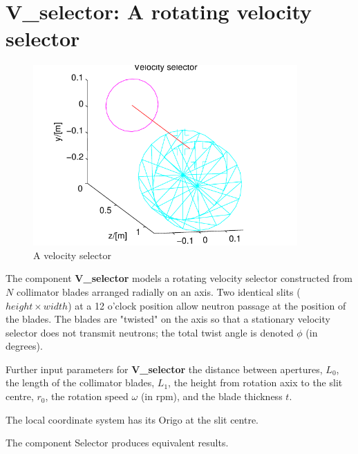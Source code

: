 \section{V\_selector: A rotating velocity selector}
\label{vselector}


\begin{figure}
  \begin{center}
    \includegraphics[width=0.9\textwidth]{figures/vselector}
  \end{center}
\caption{A velocity selector}
\label{f:vselector}
\end{figure}

The component \textbf{V\_selector} models a rotating velocity
selector constructed from $N$ collimator blades
arranged radially on an axis. Two identical slits ($height \times width$)
at a 12 o'clock position allow
neutron passage at the position of the blades.
The blades are "twisted" on the axis so that a stationary
velocity selector does not transmit neutrons; the total
twist angle is denoted $\phi$ (in degrees).

Further input parameters for \textbf{V\_selector} 
the distance between apertures, $L_0$, the length of the
collimator blades, $L_1$, the height from rotation axix to the slit
centre, $r_0$, the rotation speed $\omega$ (in rpm), 
and the blade thickness $t$.

The local coordinate system has its Origo at the slit centre.

The component \textrm{Selector} produces equivalent results.

